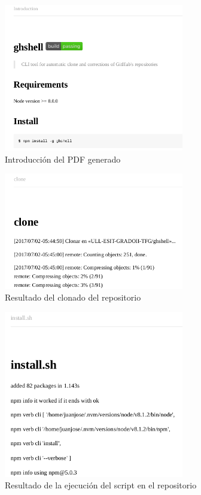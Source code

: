 \begin{itemize}
		\begin{figure}[H]
		\begin{center}
		\includegraphics[width=0.7\textwidth]{images/ghshell8-7}
		\caption{Introducción del PDF generado}
		\label{fig:ghshell8-7}
		\end{center}
		\end{figure}
		
		\begin{figure}[H]
		\begin{center}
		\includegraphics[width=0.7\textwidth]{images/ghshell8-8}
		\caption{Resultado del clonado del repositorio}
		\label{fig:ghshell8-8}
		\end{center}
		\end{figure}
		
		\begin{figure}[H]
		\begin{center}
		\includegraphics[width=0.7\textwidth]{images/ghshell8-9}
		\caption{Resultado de la ejecución del script en el repositorio}
		\label{fig:ghshell8-9}
		\end{center}
		\end{figure}   
	

\end{itemize}
